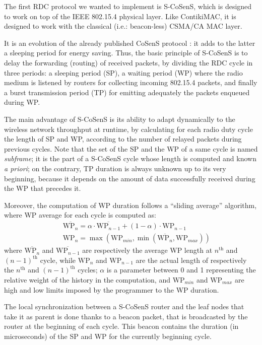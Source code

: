 \documentclass[conference]{IEEEtran}
\begin{document}
The first RDC protocol we wanted to implement is S-CoSenS, which
is designed to work on top of the IEEE 802.15.4 physical layer. Like
ContikiMAC, it is designed to work with the classical (i.e.: beacon-less)
CSMA/CA MAC layer.

It is an evolution of the already published CoSenS protocol \cite{CosensConf}:
it adds to the latter a sleeping period for energy saving.
Thus, the basic principle of S-CoSenS is to delay the forwarding (routing)
of received packets, by dividing the RDC cycle in three periods:
a sleeping period (SP), a waiting period (WP) where the radio medium
is listened by routers for collecting incoming 802.15.4 packets, and
finally a burst transmission period (TP) for emitting adequately
the packets enqueued during WP.

The main advantage of S-CoSenS is its ability to adapt dynamically to the
wireless network throughput at runtime, by calculating for each radio duty
cycle the length of SP and WP, according to the number of relayed
packets during previous cycles. Note that the set of the SP and the WP
of a same cycle is named \emph{subframe}; it is the part of a S-CoSenS
cycle whose length is computed and known \textit{a priori}; on the contrary,
TP duration is always unknown up to its very beginning, because it depends
on the amount of data successfully received during the WP that precedes it.

Moreover, the computation of WP duration follows a ``sliding average''
algorithm, where WP average for each cycle is computed as:
\begin{eqnarray*}
&&
\overline{\mathrm{WP}_{n}} = \alpha \cdot \overline{\mathrm{WP}_{n-1}}
                + (1 - \alpha) \cdot \mathrm{WP}_{n-1}
\\ &&
\mathrm{WP}_{n} = \max ( \mathrm{WP}_{min},
                  \min ( \overline{\mathrm{WP}_{n}}, \mathrm{WP}_{max} ) )
\end{eqnarray*}
where $\overline{\mathrm{WP}_{n}}$ and $\overline{\mathrm{WP}_{n-1}}$
are respectively the average WP length at $n^{\mathrm{th}}$ and
$(n-1)^{\mathrm{th}}$ cycle, while $\mathrm{WP}_{n}$ and $\mathrm{WP}_{n-1}$
are the actual length of respectively the $n^{\mathrm{th}}$ and
$(n-1)^{\mathrm{th}}$ cycles; $\alpha$ is a parameter between 0 and 1
representing the relative weight of the history in the computation,
and $\mathrm{WP}_{min}$ and $\mathrm{WP}_{max}$ are high and low limits
imposed by the programmer to the WP duration.

The local synchronization between a S-CoSenS router and the leaf nodes
that take it as parent is done thanks to a beacon packet, that is broadcasted
by the router at the beginning of each cycle. This beacon contains the
duration (in microseconds) of the SP and WP for the currently beginning cycle.
\end{document}

